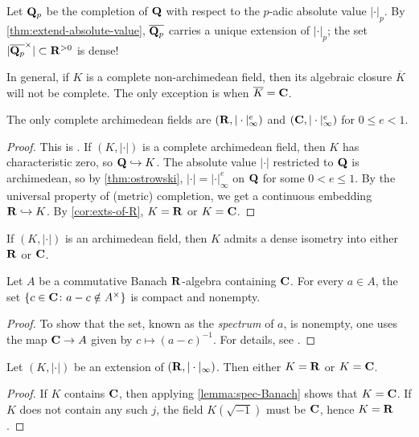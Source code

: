 \begin{example}
Let $\mathbf{Q}_p$ be the completion of $\mathbf{Q}$ with respect to the $p$-adic absolute 
value $|\cdot|_p$. By \autoref{thm:extend-absolute-value}, 
$\overline{\mathbf{Q}_p}$ carries a unique extension of $|\cdot|_p$; the set 
$|\overline{\mathbf{Q}_p}^\times|\subset \mathbf{R}^{>0}$ is dense!
\end{example}

In general, if $K$ is a complete non-archimedean field, then its algebraic 
closure $\overline K$ will not be complete. The only exception is when 
$\overline K=\mathbf{C}$.

\begin{theorem}\label{thm:Gelfand-Mazur}
The only complete archimedean fields are $(\mathbf{R},|\cdot|_\infty^e)$ and 
$(\mathbf{C},|\cdot|_\infty^e)$ for $0\leqslant e<1$. 
\end{theorem}
\begin{proof}
This is \cite[1.2.4]{engler-prestel}. If $(K,|\cdot|)$ is a complete 
archimedean field, then $K$ has characteristic zero, so $\mathbf{Q}\hookrightarrow K$. 
The absolute value $|\cdot|$ restricted to $\mathbf{Q}$ is archimedean, so by 
\autoref{thm:ostrowski}, $|\cdot|=|\cdot|_\infty^e$ on $\mathbf{Q}$ for some 
$0<e\leqslant 1$. By the universal property of (metric) completion, we get a 
continuous embedding $\mathbf{R}\hookrightarrow K$. By \autoref{cor:exts-of-R}, 
$K=\mathbf{R}$ or $K=\mathbf{C}$. 
\end{proof}

\begin{corollary}
If $(K,|\cdot|)$ is an archimedean field, then $K$ admits a dense isometry 
into either $\mathbf{R}$ or $\mathbf{C}$. 
\end{corollary}

\begin{lemma}\label{lemma:spec-Banach}
Let $A$ be a commutative Banach $\mathbf{R}$-algebra containing $\mathbf{C}$. For every 
$a\in A$, the set $\{c\in \mathbf{C}\colon a-c\notin A^\times\}$ is compact and 
nonempty. 
\end{lemma}
\begin{proof}
To show that the set, known as the \emph{spectrum} of $a$, is nonempty, 
one uses the map $\mathbf{C}\to A$ given by $c\mapsto (a-c)^{-1}$. For details, see 
\cite[18.6]{rudin-1987}. 
\end{proof}

\begin{corollary}\label{cor:exts-of-R}
Let $(K,|\cdot|)$ be an extension of $(\mathbf{R},|\cdot|_\infty)$. Then either 
$K=\mathbf{R}$ or $K=\mathbf{C}$. 
\end{corollary}
\begin{proof}
If $K$ contains $\mathbf{C}$, then applying \autoref{lemma:spec-Banach} shows that 
$K=\mathbf{C}$. If $K$ does not contain any such $j$, the field $K(\sqrt{-1})$ must be 
$\mathbf{C}$, hence $K=\mathbf{R}$. 
\end{proof}

